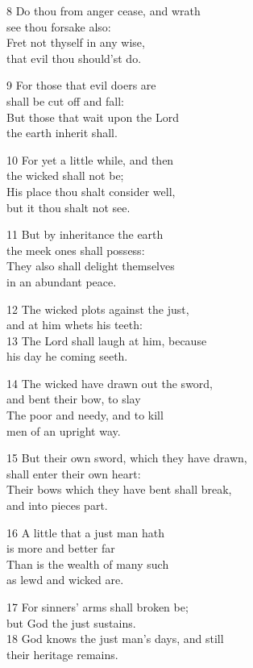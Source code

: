 8 Do thou from anger cease, and wrath\\
see thou forsake also:\\
Fret not thyself in any wise,\\
that evil thou should’st do.

9 For those that evil doers are\\
shall be cut off and fall:\\
But those that wait upon the Lord\\
the earth inherit shall.

10 For yet a little while, and then\\
the wicked shall not be;\\
His place thou shalt consider well,\\
but it thou shalt not see.

11 But by inheritance the earth\\
the meek ones shall possess:\\
They also shall delight themselves\\
in an abundant peace.

12 The wicked plots against the just,\\
and at him whets his teeth:\\
13 The Lord shall laugh at him, because\\
his day he coming seeth.

14 The wicked have drawn out the sword,\\
and bent their bow, to slay\\
The poor and needy, and to kill\\
men of an upright way.

15 But their own sword, which they have drawn,\\
shall enter their own heart:\\
Their bows which they have bent shall break,\\
and into pieces part.

16 A little that a just man hath\\
is more and better far\\
Than is the wealth of many such\\
as lewd and wicked are.

17 For sinners’ arms shall broken be;\\
but God the just sustains.\\
18 God knows the just man’s days, and still\\
their heritage remains.

